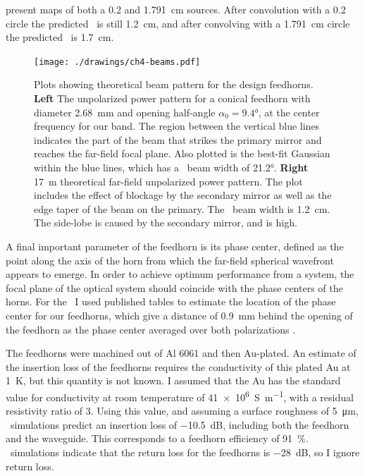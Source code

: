  present maps of both a \SI{0.2}{\in} and \SI{1.791}{\cm} sources.
After convolution with a \SI{0.2}{\in} circle the predicted \FWHM\ is still \SI{1.2}{\cm}, and after convolving with a \SI{1.791}{\cm} circle the predicted \FWHM\ is \SI{1.7}{\cm}.

\begin{figure}
\centering
\texttt{[image: ./drawings/ch4-beams.pdf]}
\caption[Beam patterns]{
  Plots showing theoretical beam pattern for the design feedhorns.
  \textbf{Left} The unpolarized power pattern for a conical feedhorn with diameter \SI{2.68}{\mm} and opening half-angle $\alpha_0 = \ang{9.4}$, at the center frequency for our band.
  The region between the vertical blue lines indicates the part of the beam that strikes the primary mirror and reaches the far-field focal plane.
  Also plotted is the best-fit Gaussian within the blue lines, which has a \FWHM\ beam width of \ang{21.2}.
  \textbf{Right} \SI{17}{\m} theoretical far-field unpolarized power pattern.
  The plot includes the effect of blockage by the secondary mirror as well as the edge taper of the beam on the primary.
  The \FWHM\ beam width is \SI{1.2}{\cm}.
  The side-lobe is caused by the secondary mirror, and is  high.
}
\label{fig:ch4-beams}
\end{figure}

A final important parameter of the feedhorn is its phase center, defined as the point along the axis of the horn from which the far-field spherical wavefront appears to emerge.
In order to achieve optimum performance from a system, the focal plane of the optical system should coincide with the phase centers of the horns.
For the \Imager\ I used published tables to estimate the location of the phase center for our feedhorns, which give a distance of \SI{0.9}{\mm} behind the opening of the feedhorn as the phase center averaged over both polarizations \cite[Page~353]{thomas_a._milligan_modern_2005}.

The feedhorns were machined out of Al 6061 and then Au-plated.
An estimate of the insertion loss of the feedhorns requires the conductivity of this plated Au at \SI{1}{\K}, but this quantity is not known.
I assumed that the Au has the standard value for conductivity at room temperature of \SI{41e6}{S\per\m}, with a residual resistivity ratio of 3.
Using this value, and assuming a surface roughness of \SI{5}{\um}, \HFSS\ simulations predict an insertion loss of \SI{-10.5}{\dB}, including both the feedhorn and the waveguide.
This corresponds to a feedhorn efficiency of \SI{91}{\percent}.
\HFSS\ simulations indicate that the return loss for the feedhorns is \SI{-28}{\dB}, so I ignore return loss.

